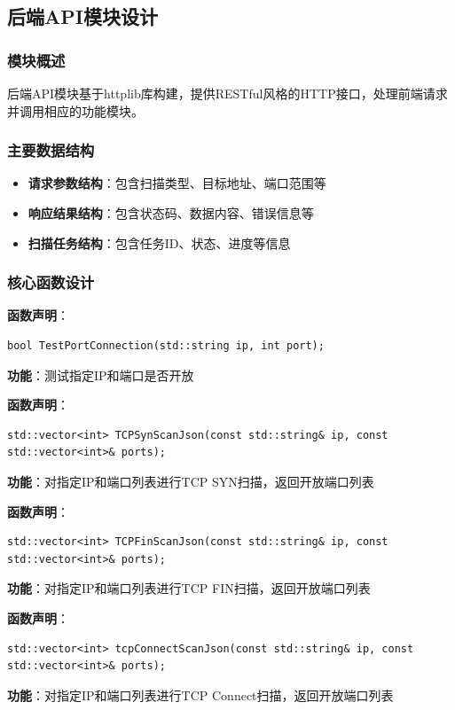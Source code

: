 \documentclass[12pt,hyperref,a4paper,UTF8]{ctexart}
\begin{document}


\subsection{后端API模块设计}

\subsubsection{模块概述}
后端API模块基于httplib库构建，提供RESTful风格的HTTP接口，处理前端请求并调用相应的功能模块。

\subsubsection{主要数据结构}
\begin{itemize}
    \item \textbf{请求参数结构}：包含扫描类型、目标地址、端口范围等
    \item \textbf{响应结果结构}：包含状态码、数据内容、错误信息等
    \item \textbf{扫描任务结构}：包含任务ID、状态、进度等信息
\end{itemize}

\subsubsection{核心函数设计}

\textbf{函数声明}：
\begin{verbatim}
bool TestPortConnection(std::string ip, int port);
\end{verbatim}
\textbf{功能}：测试指定IP和端口是否开放

\textbf{函数声明}：
\begin{verbatim}
std::vector<int> TCPSynScanJson(const std::string& ip, const std::vector<int>& ports);
\end{verbatim}
\textbf{功能}：对指定IP和端口列表进行TCP SYN扫描，返回开放端口列表

\textbf{函数声明}：
\begin{verbatim}
std::vector<int> TCPFinScanJson(const std::string& ip, const std::vector<int>& ports);
\end{verbatim}
\textbf{功能}：对指定IP和端口列表进行TCP FIN扫描，返回开放端口列表

\textbf{函数声明}：
\begin{verbatim}
std::vector<int> tcpConnectScanJson(const std::string& ip, const std::vector<int>& ports);
\end{verbatim}
\textbf{功能}：对指定IP和端口列表进行TCP Connect扫描，返回开放端口列表
\end{document}
